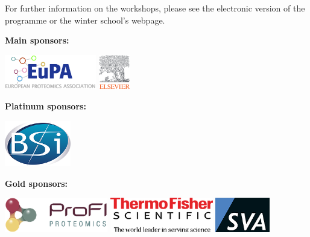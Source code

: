 \documentclass[a5paper,10pt,oneside]{article}
\begin{document}
\pagebreak

\noindent For further information on the workshops, please see the electronic version of the programme or the winter school's webpage.

\pagebreak


\pagebreak


\pagebreak



\pagebreak
{}
\textbf{Main sponsors:}
\begin{center}
  \includegraphics[height=1.5cm]{graphics/eupa-logo}\hspace*{2cm}
  \includegraphics[height=1.5cm]{graphics/ELS_Logo_Orange_RGB}
\end{center}
\vspace*{.5cm}
\noindent\textbf{Platinum sponsors:}
\begin{center}
  \includegraphics[height=2cm]{graphics/Bioinformatics_Solutions_Inc__svg}
\end{center}
\vspace*{.5cm}
\noindent\textbf{Gold sponsors:}
\begin{center}
  \includegraphics[height=1.5cm]{graphics/logo_ProFi}\hspace*{0.5cm}
  \includegraphics[height=1.5cm]{graphics/thermo-logo}\hspace*{0.5cm}
  \includegraphics[height=1.5cm]{graphics/sva_logo}
\end{center}
\end{document}
